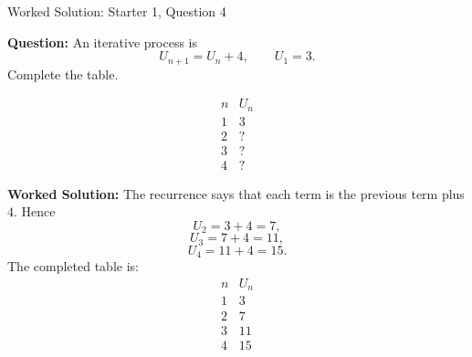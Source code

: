 \documentclass{beamer}
\begin{document}
\begin{frame}{Worked Solution: Starter 1, Question 4}

\textbf{Question:} An iterative process is
\[
U_{n+1} = U_n + 4, \qquad U_1 = 3.
\]
Complete the table.

\[
\begin{array}{c|c}
n & U_n \\
\hline
1 & 3 \\
2 & ? \\
3 & ? \\
4 & ?
\end{array}
\]

\textbf{Worked Solution:} The recurrence says that each term is the previous term plus \(4\). Hence
\[
U_2 = 3 + 4 = 7,
\]
\[
U_3 = 7 + 4 = 11,
\]
\[
U_4 = 11 + 4 = 15.
\]
The completed table is:
\[
\begin{array}{c|c}
n & U_n \\
\hline
1 & 3 \\
2 & 7 \\
3 & 11 \\
4 & 15
\end{array}
\]

\end{frame}
\end{document}
